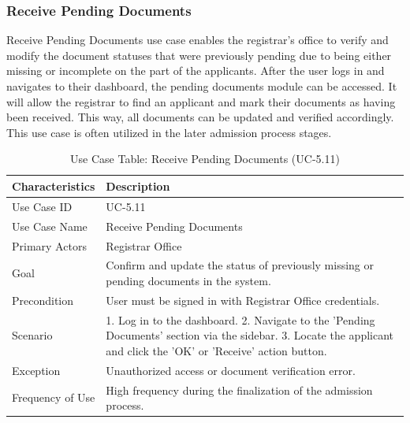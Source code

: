 \subsubsection{Receive Pending Documents}
Receive Pending Documents use case enables the registrar’s office to verify and modify the document statuses that were previously pending due to being either missing or incomplete on the part of the applicants. After the user logs in and navigates to their dashboard, the pending documents module can be accessed. It will allow the registrar to find an applicant and mark their documents as having been received. This way, all documents can be updated and verified accordingly. This use case is often utilized in the later admission process stages.
\begin{table}[H]
    \centering
    \small
    \renewcommand{\arraystretch}{1.4}
    \caption{Use Case Table: Receive Pending Documents (UC-5.11)} %
    \label{tab:receive-pending-docs-registrar}
    \begin{tabularx}{\textwidth}{|l|X|}
        \hline
        \rowcolor[gray]{0.9} {Characteristics} & {Description} \\ \hline
        Use Case ID & UC-5.11 \\ \hline
        Use Case Name & Receive Pending Documents \\ \hline
        Primary Actors & Registrar Office \\ \hline
        Goal & Confirm and update the status of previously missing or pending documents in the system. \\ \hline
        Precondition & User must be signed in with Registrar Office credentials. \\ \hline
        Scenario & 1. Log in to the dashboard. 2. Navigate to the 'Pending Documents' section via the sidebar. 3. Locate the applicant and click the 'OK' or 'Receive' action button. \\ \hline
        Exception & Unauthorized access or document verification error. \\ \hline
        Frequency of Use & High frequency during the finalization of the admission process. \\ \hline
    \end{tabularx}
\end{table}
\FloatBarrier